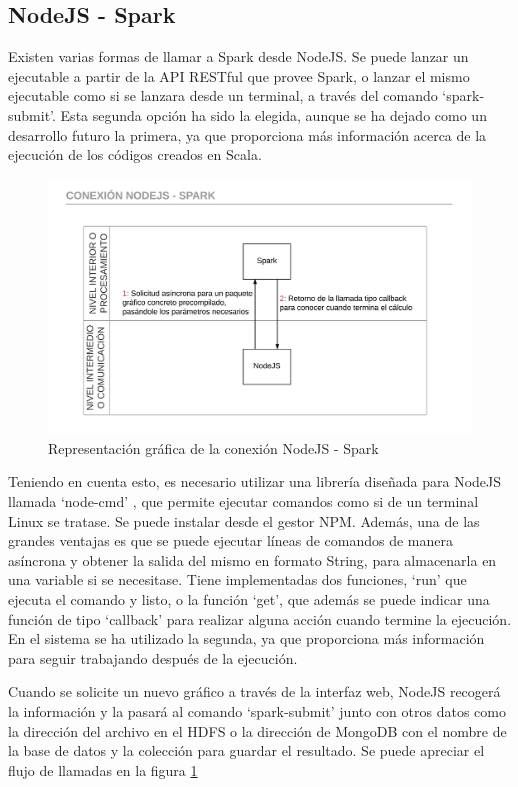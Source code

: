 \subsection{NodeJS - Spark}

Existen varias formas de llamar a Spark desde NodeJS. Se puede lanzar un ejecutable a partir de la API RESTful que provee Spark, o lanzar el mismo ejecutable como si se lanzara desde un terminal, a través del comando ‘spark-submit’. Esta segunda opción ha sido la elegida, aunque se ha dejado como un desarrollo futuro la primera, ya que proporciona más información acerca de la ejecución de los códigos creados en Scala. 

\begin{figure}
	\centering
	\includegraphics[width=1\linewidth]{imagenes/Conexion_NodeJS_Spark}
	\caption{Representación gráfica de la conexión NodeJS - Spark}
	\label{fig:conexionnodejsspark}
\end{figure}

Teniendo en cuenta esto, es necesario utilizar una librería diseñada para NodeJS llamada ‘node-cmd’ \cite{NodeCmd}, que permite ejecutar comandos como si de un terminal Linux se tratase. Se puede instalar desde el gestor NPM. Además, una de las grandes ventajas es que se puede ejecutar líneas de comandos de manera asíncrona y obtener la salida del mismo en formato String, para almacenarla en una variable si se necesitase. Tiene implementadas dos funciones, ‘run’ que ejecuta el comando y listo, o la función ‘get’, que además se puede indicar una función de tipo ‘callback’ para realizar alguna acción cuando termine la ejecución. En el sistema se ha utilizado la segunda, ya que proporciona más información para seguir trabajando después de la ejecución. 

Cuando se solicite un nuevo gráfico a través de la interfaz web, NodeJS recogerá la información y la pasará al comando ‘spark-submit’ junto con otros datos como la dirección del archivo en el HDFS o la dirección de MongoDB con el nombre de la base de datos y la colección para guardar el resultado. Se puede apreciar el flujo de llamadas en la figura \ref{fig:conexionnodejsspark}

